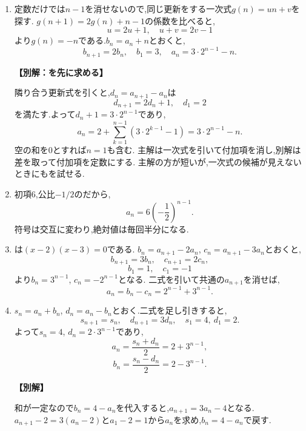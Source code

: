 \begin{enumerate}[label=\textbf{問\arabic*.},leftmargin=3.8em,format=\bookitemlink{practice-basic}{solution}{problem}]
          \item 定数だけでは$n-1$を消せないので,同じ更新をする一次式$g(n)=un+v$を探す.
                  $g(n+1)=2g(n)+n-1$の係数を比べると,
                  \[
                    u=2u+1,\quad u+v=2v-1
                  \]
                  より$g(n)=-n$である.$b_n=a_n+n$とおくと,
                  \[
                    b_{n+1}=2b_n,\quad b_1=3,\quad a_n=3\cdot2^{n-1}-n.
                  \]
                  \par\smallskip\noindent\textbf{【別解：を先に求める】}\par
                  隣り合う更新式を引くと,$d_n=a_{n+1}-a_n$は
                  \[
                    d_{n+1}=2d_n+1,\quad d_1=2
                  \]
                  を満たす.よって$d_n+1=3\cdot2^{n-1}$であり,
                  \[
                    a_n=2+\sum_{k=1}^{n-1}(3\cdot2^{k-1}-1)
                       =3\cdot2^{n-1}-n.
                  \]
                  空の和を$0$とすれば$n=1$も含む.
                  主解は一次式を引いて付加項を消し,別解は差を取って付加項を定数にする.
                  主解の方が短いが,一次式の候補が見えないときにもを試せる.

          \item 初項$6$,公比$-1/2$のだから,
                  \[
                    a_n=6\left(-\frac12\right)^{n-1}.
                  \]
                  符号は交互に変わり,絶対値は毎回半分になる.

          \item {}は$(x-2)(x-3)=0$である.
                  $b_n=a_{n+1}-2a_n$, $c_n=a_{n+1}-3a_n$とおくと,
                  \[
                    b_{n+1}=3b_n,\quad c_{n+1}=2c_n,
                  \]
                  \[
                    b_1=1,\quad c_1=-1
                  \]
                  より$b_n=3^{n-1}$, $c_n=-2^{n-1}$となる.
                  二式を引いて共通の$a_{n+1}$を消せば,
                  \[
                    a_n=b_n-c_n=2^{n-1}+3^{n-1}.
                  \]

          \item $s_n=a_n+b_n$, $d_n=a_n-b_n$とおく.二式を足し引きすると,
                  \[
                    s_{n+1}=s_n,\quad d_{n+1}=3d_n,\quad s_1=4,\ d_1=2.
                  \]
                  よって$s_n=4$, $d_n=2\cdot3^{n-1}$であり,
                  \[
                    a_n=\frac{s_n+d_n}{2}=2+3^{n-1},
                  \]
                  \[
                    b_n=\frac{s_n-d_n}{2}=2-3^{n-1}.
                  \]
                  \par\smallskip\noindent\textbf{【別解】}\par
                  和が一定なので$b_n=4-a_n$を代入すると,$a_{n+1}=3a_n-4$となる.
                  $a_{n+1}-2=3(a_n-2)$と$a_1-2=1$から$a_n$を求め,$b_n=4-a_n$で戻す.


\end{enumerate}

